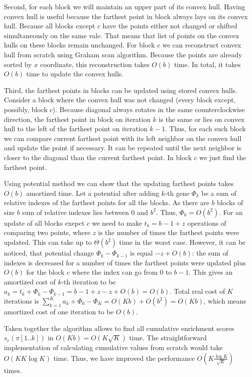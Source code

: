 \documentclass[runningheads,a4paper]{llncs}
\begin{document}
Second, for each block we will maintain an upper part of its convex hull.
Having convex hull is useful because the farthest point in block always
lays on its convex hull.
Because all blocks except $c$ have the points either not changed or
shifted simultaneously on the same vale. That means that list of points
on the convex hulls on these blocks remain unchanged. For block $c$
we can reconstruct convex hull from scratch using Graham scan algorithm.
Because the points are already sorted by $x$ coordinate, this
reconstruction takes $O(b)$ time. In total, it takes $O(b)$ time
to update the convex hulls.

Third, the farthest points in blocks can be updated using stored convex
hulls. Consider a block where the convex hull was not changed (every block
except, possibly, block $c$). Because diagonal always rotates in the same
counterclockwise direction, the farthest point in block on iteration $k$
is the same or lies on convex hull to the left of the farthest point
on iteration $k-1$. Thus, for each such block we can compare current farthest
point with its left neighbor on the convex hull and update the point if
necessary. It can be repeated until the next neighbor is closer to the 
diagonal than the current farthest point. In block $c$ we just 
find the farthest point.

Using potential method we can show that the updating farthest points
takes $O(b)$ amortized time. Let a potential after adding $k$-th
gene $\Phi_k$ be a sum of relative indexes of the farthest points
for all the blocks. As there are $b$ blocks of size $b$ sum of relative
indexes lies between 0 and $b^2$. Thus, $\Phi_k = O(b^2)$. For an 
update of all blocks exepct $c$ we need to make $t_k=b-1+z$ 
operations of comparing two points,
where $z$ is the number of times the farthest points were updated. 
This can take up to $\Theta(b^2)$ time in the worst case.
However, it can be noticed, that 
potential change $\Phi_k-\Phi_{k-1}$ is
equal $-z + O(b)$: the sum of indexes is decreased for a number of 
times the farthest points were updated plus $O(b)$ for the block
$c$ where the index can go from 0 to $b-1$.
This gives an amortized cost of $k$-th iteration to be $a_k = t_k + \Phi_k - \Phi_{k-1} = 
b - 1 + z -z + O(b) = O(b)$. Total real cost of $K$ iterations 
is $\sum_{k=1}^K a_k + \Phi_0 - \Phi_K = O(Kb) + O(b^2) = O(Kb)$,
which means amortized cost of one iteration to be $O(b)$.

Taken together the algorithm allows to find all cumulative
enrichment scores $s_r(\pi[1..k])$ in $O(Kb) = O(K\sqrt{K})$ time.
The straightforward implementation of calculating cumulative
values from scratch would take $O(KK\log K)$ time. Thus,
we have improved the performance $O(K \frac{\log K}{\sqrt{K}})$ times.
\end{document}
